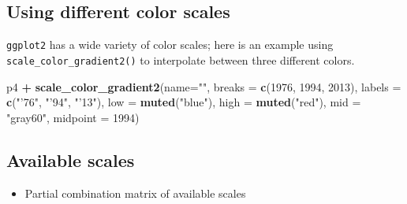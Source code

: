 \documentclass[]{book}
\newenvironment{Shaded}{\begin{snugshade}}{\end{snugshade}}
\newcommand{\KeywordTok}[1]{\textcolor[rgb]{0.13,0.29,0.53}{\textbf{#1}}}
\newcommand{\DataTypeTok}[1]{\textcolor[rgb]{0.13,0.29,0.53}{#1}}
\newcommand{\DecValTok}[1]{\textcolor[rgb]{0.00,0.00,0.81}{#1}}
\newcommand{\StringTok}[1]{\textcolor[rgb]{0.31,0.60,0.02}{#1}}
\newcommand{\OperatorTok}[1]{\textcolor[rgb]{0.81,0.36,0.00}{\textbf{#1}}}
\newcommand{\NormalTok}[1]{#1}
\providecommand{\tightlist}{%
  \setlength{\itemsep}{0pt}\setlength{\parskip}{0pt}}
\begin{document}
\subsection{Using different color
scales}\label{using-different-color-scales}

\texttt{ggplot2} has a wide variety of color scales; here is an example
using \texttt{scale\_color\_gradient2()} to interpolate between three
different colors.

\begin{Shaded}
\begin{Highlighting}[]
\NormalTok{p4 }\OperatorTok{+}
\StringTok{  }\KeywordTok{scale_color_gradient2}\NormalTok{(}\DataTypeTok{name=}\StringTok{""}\NormalTok{,}
                        \DataTypeTok{breaks =} \KeywordTok{c}\NormalTok{(}\DecValTok{1976}\NormalTok{, }\DecValTok{1994}\NormalTok{, }\DecValTok{2013}\NormalTok{),}
                        \DataTypeTok{labels =} \KeywordTok{c}\NormalTok{(}\StringTok{"'76"}\NormalTok{, }\StringTok{"'94"}\NormalTok{, }\StringTok{"'13"}\NormalTok{),}
                        \DataTypeTok{low =} \KeywordTok{muted}\NormalTok{(}\StringTok{"blue"}\NormalTok{),}
                        \DataTypeTok{high =} \KeywordTok{muted}\NormalTok{(}\StringTok{"red"}\NormalTok{),}
                        \DataTypeTok{mid =} \StringTok{"gray60"}\NormalTok{,}
                        \DataTypeTok{midpoint =} \DecValTok{1994}\NormalTok{)}
\end{Highlighting}
\end{Shaded}

\subsection{Available scales}\label{available-scales}

\begin{itemize}
\tightlist
\item
  Partial combination matrix of available scales
\end{itemize}
\end{document}

